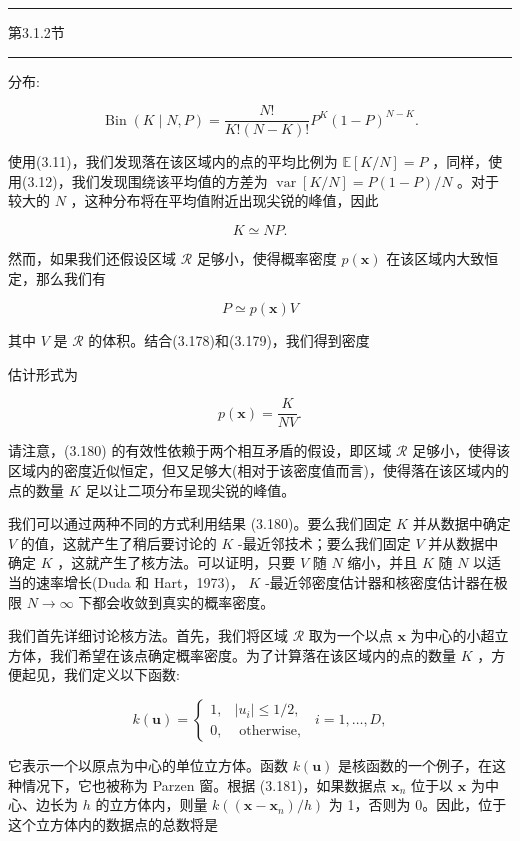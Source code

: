 \documentclass[10pt]{article}
\newcommand{\HRule}{\begin{center}\rule{0.9\linewidth}{0.2mm}\end{center}}
\begin{document}
\HRule

第3.1.2节

\HRule

分布:

\[
\operatorname{Bin}\left( {K \mid  N,P}\right)  = \frac{N!}{K!\left( {N - K}\right) !}{P}^{K}{\left( 1 - P\right) }^{N - K}. \tag{3.177}
\]

使用(3.11)，我们发现落在该区域内的点的平均比例为 \(\mathbb{E}\left\lbrack  {K/N}\right\rbrack   = P\) ，同样，使用(3.12)，我们发现围绕该平均值的方差为 \(\operatorname{var}\left\lbrack  {K/N}\right\rbrack   = P\left( {1 - P}\right) /N\) 。对于较大的 \(N\) ，这种分布将在平均值附近出现尖锐的峰值，因此

\[
K \simeq  {NP}. \tag{3.178}
\]

然而，如果我们还假设区域 \(\mathcal{R}\) 足够小，使得概率密度 \(p\left( \mathbf{x}\right)\) 在该区域内大致恒定，那么我们有

\[
P \simeq  p\left( \mathbf{x}\right) V \tag{3.179}
\]

其中 \(V\) 是 \(\mathcal{R}\) 的体积。结合(3.178)和(3.179)，我们得到密度

估计形式为

\[
p\left( \mathbf{x}\right)  = \frac{K}{NV}. \tag{3.180}
\]

请注意，(3.180) 的有效性依赖于两个相互矛盾的假设，即区域 \(\mathcal{R}\) 足够小，使得该区域内的密度近似恒定，但又足够大(相对于该密度值而言)，使得落在该区域内的点的数量 \(K\) 足以让二项分布呈现尖锐的峰值。

我们可以通过两种不同的方式利用结果 (3.180)。要么我们固定 \(K\) 并从数据中确定 \(V\) 的值，这就产生了稍后要讨论的 \(K\) -最近邻技术；要么我们固定 \(V\) 并从数据中确定 \(K\) ，这就产生了核方法。可以证明，只要 \(V\) 随 \(N\) 缩小，并且 \(K\) 随 \(N\) 以适当的速率增长(Duda 和 Hart，1973)， \(K\) -最近邻密度估计器和核密度估计器在极限 \(N \rightarrow  \infty\) 下都会收敛到真实的概率密度。

我们首先详细讨论核方法。首先，我们将区域 \(\mathcal{R}\) 取为一个以点 \(\mathbf{x}\) 为中心的小超立方体，我们希望在该点确定概率密度。为了计算落在该区域内的点的数量 \(K\) ，方便起见，我们定义以下函数:

\[
k\left( \mathbf{u}\right)  = \left\{  {\begin{array}{ll} 1, & \left| {u}_{i}\right|  \leq  1/2, \\  0, & \text{ otherwise, } \end{array}\;i = 1,\ldots ,D,}\right.  \tag{3.181}
\]

它表示一个以原点为中心的单位立方体。函数 \(k\left( \mathbf{u}\right)\) 是核函数的一个例子，在这种情况下，它也被称为 Parzen 窗。根据 (3.181)，如果数据点 \({\mathbf{x}}_{n}\) 位于以 \(\mathbf{x}\) 为中心、边长为 \(h\) 的立方体内，则量 \(k\left( {\left( {\mathbf{x} - {\mathbf{x}}_{n}}\right) /h}\right)\) 为 1，否则为 0。因此，位于这个立方体内的数据点的总数将是
\end{document}
